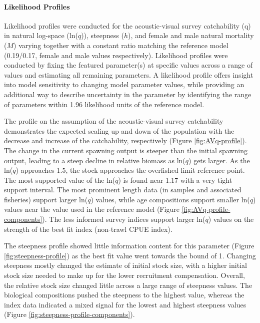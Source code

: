 \documentclass[11pt,
  letterpaper,
]{article}
\begin{document}
\hypertarget{likelihood-profiles}{%
\paragraph{Likelihood Profiles}\label{likelihood-profiles}}

Likelihood profiles were conducted for the acoustic-visual survey catchability (q) in natural log-space (ln(\(q\))), steepness (\(h\)), and female and male natural mortality (\(M\)) varying together with a constant ratio matching the reference model (0.19/0.17, female and male values respectively). Likelihood profiles were conducted by fixing the featured parameter(s) at specific values across a range of values and estimating all remaining parameters. A likelihood profile offers insight into model sensitivity to changing model parameter values, while providing an additional way to describe uncertainty in the parameter by identifying the range of parameters within 1.96 likelihood units of the reference model.

The profile on the assumption of the acoustic-visual survey catchability demonstrates the expected scaling up and down of the population with the decrease and increase of the catchability, respectively (Figure \ref{fig:AVq-profile}). The change in the current spawning output is steeper than the initial spawning output, leading to a steep decline in relative biomass as ln(\(q\)) gets larger. As the ln(\(q\)) approaches 1.5, the stock approaches the overfished limit reference point. The most supported value of the ln(\(q\)) is found near 1.17 with a very tight support interval. The most prominent length data (in samples and associated fisheries) support larger ln(\(q\)) values, while age compositions support smaller ln(\(q\)) values near the value used in the reference model (Figure \ref{fig:AVq-profile-components}). The less informed survey indices support larger ln(\(q\)) values on the strength of the best fit index (non-trawl CPUE index).

The steepness profile showed little information content for this parameter (Figure \ref{fig:steepness-profile}) as the best fit value went towards the bound of 1. Changing steepness mostly changed the estimate of initial stock size, with a higher initial stock size needed to make up for the lower recruitment compensation. Overall, the relative stock size changed little across a large range of steepness values. The biological compositions pushed the steepness to the highest value, whereas the index data indicated a mixed signal for the lowest and highest steepness values (Figure \ref{fig:steepness-profile-components}).
\end{document}
